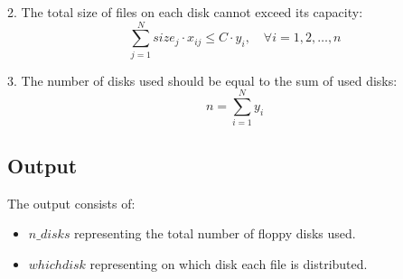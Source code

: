 \documentclass{article}
\begin{document}
2. The total size of files on each disk cannot exceed its capacity:
   \[
   \sum_{j=1}^{N} size_j \cdot x_{ij} \leq C \cdot y_i, \quad \forall i = 1, 2, \ldots, n
   \]
   
3. The number of disks used should be equal to the sum of used disks:
   \[
   n = \sum_{i=1}^{N} y_i
   \]

\subsection*{Output}
The output consists of:
\begin{itemize}
    \item \( n\_disks \) representing the total number of floppy disks used.
    \item \( whichdisk \) representing on which disk each file is distributed.
\end{itemize}
\end{document}
